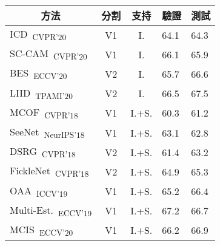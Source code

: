 \begin{table}[]
\normalsize
\centering
{\small
\begin{tabular}{@{}lccll@{}}
\toprule
\multicolumn{1}{c}{方法}                                                              & 分割      & 支持  & \multicolumn{1}{c}{驗證} & \multicolumn{1}{c}{測試} \\ \midrule
\multicolumn{1}{l}{ICD~\cite{fan2020learning}\textsubscript{CVPR'20}}                   & V1        & I.    & 64.1                    & 64.3                     \\ 
\multicolumn{1}{l}{SC-CAM~\cite{chang2020weakly}\textsubscript{CVPR'20}}                & V1        & I.    & 66.1                    & 65.9                     \\
\multicolumn{1}{l}{BES~\cite{chen2020boundary}\textsubscript{ECCV'20}}                  & V2        & I.    & 65.7                    & 66.6                     \\
\multicolumn{1}{l}{LIID~\cite{liu2020leveraging}\textsubscript{TPAMI'20}}                  & V2        & I.    & 66.5                    & 67.5                     \\
\multicolumn{1}{l}{MCOF~\cite{wang2018weakly}\textsubscript{CVPR'18}}                   & V1        & I.+S. & 60.3                    & 61.2                     \\
\multicolumn{1}{l}{SeeNet~\cite{hou2018self}\textsubscript{NeurIPS'18}}                 & V1        & I.+S. & 63.1                    & 62.8                     \\
\multicolumn{1}{l}{DSRG~\cite{huang2018weakly}\textsubscript{CVPR'18}}                  & V2        & I.+S. & 61.4                    & 63.2                     \\
\multicolumn{1}{l}{FickleNet~\cite{lee2019ficklenet}\textsubscript{CVPR'18}}            & V2        & I.+S. & 64.9                    & 65.3                     \\
\multicolumn{1}{l}{OAA~\cite{jiang2019integral}\textsubscript{ICCV'19}}                 & V1        & I.+S. & 65.2                    & 66.4                     \\
\multicolumn{1}{l}{Multi-Est.~\cite{fan2020employing}\textsubscript{ECCV'19}}           & V1        & I.+S. & 67.2                    & 66.7                     \\
\multicolumn{1}{l}{MCIS~\cite{sun2020mining}\textsubscript{ECCV'20}}                    & V1        & I.+S. & 66.2                    & 66.9                     \\

\end{tabular}}
\end{table}
